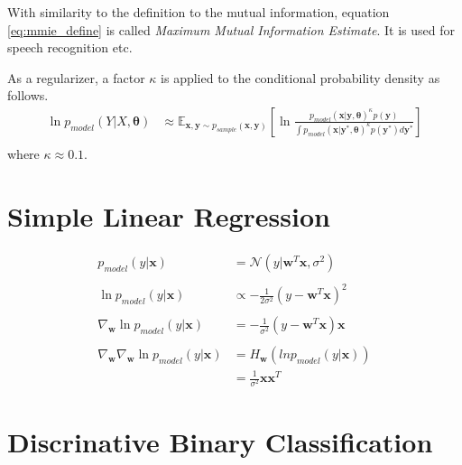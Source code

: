 \documentclass[a4]{article}
\begin{document}
With similarity to the definition to the mutual information, equation \ref{eq:mmie_define} is
called \emph{Maximum Mutual Information Estimate}. It is used for speech recognition etc.

As a regularizer, a factor $\kappa$ is applied to the conditional probability density as follows.
\begin{equation}
\begin{aligned}
\ln p_{model}(Y|X, \bm{\theta}) 
&\approx
\mathbb{E}_{\bm{x},\bm{y} \sim p_{sample}(\bm{x},\bm{y})}\left[
\ln \frac{ p_{model}(\bm{x}|\bm{y}, \bm{\theta})^\kappa p(\bm{y}) }
     { \int p_{model}(\bm{x}|\bm{y}^*, \bm{\theta})^\kappa p(\bm{y}^*)d\bm{y}^* }
\right]\\
\end{aligned}
\end{equation}
where $\kappa \approx 0.1$.


\section{Simple Linear Regression}

\begin{equation}
\begin{aligned}
p_{model}(y|\bm{x}) &= \mathcal{N}(y | \bm{w}^T\bm{x}, \sigma^2)\\
\\
\ln p_{model}(y|\bm{x}) &\propto -\frac{1}{2\sigma^2}(y - \bm{w}^T\bm{x})^2\\
\\
\nabla_{\bm{w}}\ln p_{model}(y|\bm{x}) 
&= -\frac{1}{\sigma^2}(y - \bm{w}^T\bm{x})\bm{x}\\
\\
\nabla_{\bm{w}}\nabla_{\bm{w}}\ln p_{model}(y|\bm{x}) 
&= H_{\bm{w}}\left(ln p_{model}(y|\bm{x}) \right)\\
&=\frac{1}{\sigma^2}\bm{x}\bm{x}^T
\end{aligned}
\end{equation}


\section{Discrinative Binary Classification}
\end{document}
